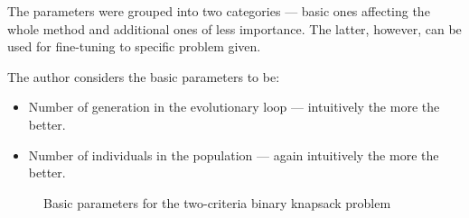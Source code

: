 The parameters were grouped into two categories --- basic ones affecting the
whole method and additional ones of less importance. The latter, however, can
be used for fine-tuning to specific problem given.

The author considers the basic parameters to be:
\begin{itemize}
\item Number of generation in the evolutionary loop --- intuitively the more
  the better.
\item Number of individuals in the population --- again intuitively the more
  the better.
\end{itemize}


\begin{figure}
  \centering
  \caption{Basic parameters for the two-criteria binary knapsack problem}
  \label{c2_params}
\end{figure}

